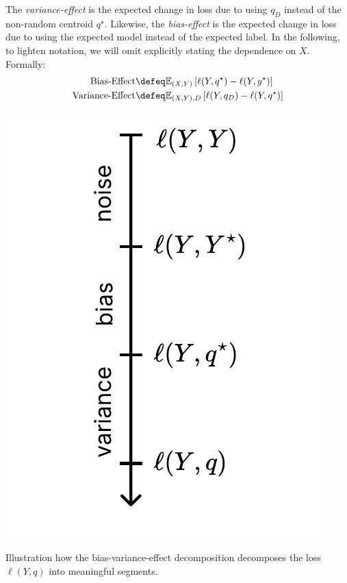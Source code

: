 \documentclass[
	twoside=false, %
]{kaobook}
\begin{document}
The \textit{variance-effect} is the expected change in loss due to using $q_{D}$ instead of the non-random centroid $q^\star$. Likewise, the \textit{bias-effect} is the expected change in loss due to using the expected model instead of the expected label. In the following, to lighten notation, we will omit explicitly stating the dependence on $X$.
Formally:
\begin{align*}
\text{Bias-Effect} &\defeq \mathbb{E}_{(X,Y)}\left[ \ell(Y, q^\star) - \ell(Y, y^\star) \right] \\
\text{Variance-Effect} &\defeq \mathbb{E}_{(X,Y),D}\left[ \ell(Y, q_{D}) - \ell(Y, q^\star) \right] 
\end{align*}


\begin{marginfigure}
  \includegraphics[width=\textwidth]{figma-illustrations/effect-decomp.pdf}
  \caption{
    Illustration how the bias-variance-effect decomposition decomposes the loss $\ell(Y, q)$ into meaningful segments.
  }
  \label{fig:margin-decomp-geometry}
\end{marginfigure}
\end{document}
